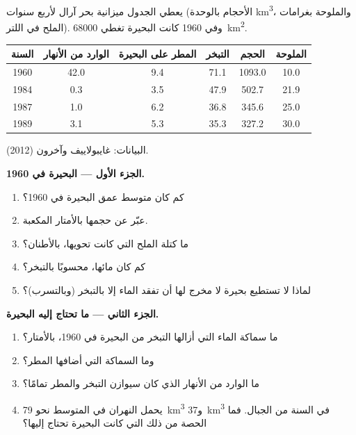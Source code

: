 \begin{problem}
\label{pb:g10:freshwater-resources:1}
يعطي الجدول ميزانية بحر آرال لأربع سنوات (الأحجام بالوحدة
\unit{km^3}، والملوحة بغرامات الملح في اللتر). وفي 1960 كانت البحيرة تغطي
\qty{68000}{km^2}.
\begin{center}
\small
\begin{tabular}{|c|c|c|c|c|c|}
\hline
السنة & الوارد من الأنهار & المطر على البحيرة & التبخر & الحجم & الملوحة \\ \hline
1960 & 42.0 & 9.4 & 71.1 & 1093.0 & 10.0 \\ \hline
1984 & 0.3 & 3.5 & 47.9 & 502.7 & 21.9 \\ \hline
1987 & 1.0 & 6.2 & 36.8 & 345.6 & 25.0 \\ \hline
1989 & 3.1 & 5.3 & 35.3 & 327.2 & 30.0 \\ \hline
\end{tabular}

{\small البيانات: غايبولاييف وآخرون (2012).}
\end{center}

\medskip
\noindent\textbf{الجزء الأول --- البحيرة في 1960.}
\begin{enumerate}
  \item كم كان متوسط عمق البحيرة في 1960؟
  \item عبّر عن حجمها بالأمتار المكعبة.
  \item ما كتلة الملح التي كانت تحويها، بالأطنان؟
  \item كم كان  مائها، محسوبًا بالتبخر؟
  \item لماذا لا تستطيع بحيرة لا مخرج لها أن تفقد الماء إلا بالتبخر (وبالتسرب)؟
\end{enumerate}

\medskip
\noindent\textbf{الجزء الثاني --- ما تحتاج إليه البحيرة.}
\begin{enumerate}[resume]
  \item ما سماكة الماء التي أزالها التبخر من البحيرة في
        1960، بالأمتار؟
  \item وما السماكة التي أضافها المطر؟
  \item ما الوارد من الأنهار الذي كان سيوازن التبخر والمطر تمامًا؟
  \item يحمل النهران في المتوسط نحو \qty{79}{km^3}
        و\qty{37}{km^3} في السنة من الجبال. فما الحصة من ذلك التي كانت
        البحيرة تحتاج إليها؟
\end{enumerate}


\end{problem}
